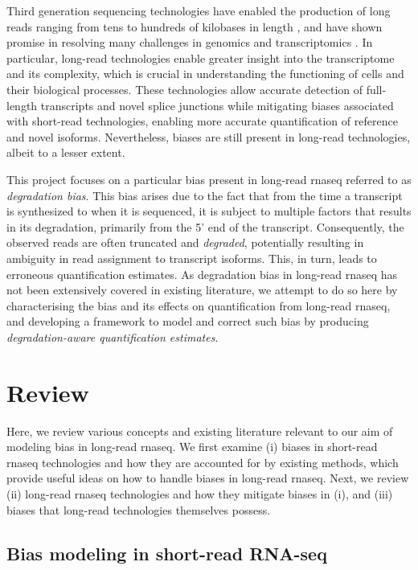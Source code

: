 
Third generation sequencing technologies have enabled the production of long reads ranging from tens to hundreds of kilobases in length \cite{Pollard2018}, and have shown promise in resolving many challenges in genomics and transcriptomics \cite{Bolisetty2015, Byrne2017, DeCoster2019, Liu2019, Mantere2019, Nurk2021}. In particular, long-read technologies enable greater insight into the transcriptome and its complexity, which is crucial in understanding the functioning of cells and their biological processes. These technologies allow accurate detection of full-length transcripts and novel splice junctions while mitigating biases associated with short-read technologies, enabling more accurate quantification of reference and novel isoforms. Nevertheless, biases are still present in long-read technologies, albeit to a lesser extent. 

This project focuses on a particular bias present in long-read \gls{rnaseq} referred to as \textit{degradation bias}. This bias arises due to the fact that from the time a transcript is synthesized to when it is sequenced, it is subject to multiple factors that results in its degradation, primarily from the 5' end of the transcript. Consequently, the observed reads are often truncated and \textit{degraded}, potentially resulting in ambiguity in read assignment to transcript isoforms. This, in turn, leads to erroneous quantification estimates. As degradation bias in long-read \gls{rnaseq} has not been extensively covered in existing literature, we attempt to do so here by characterising the bias and its effects on quantification from long-read \gls{rnaseq}, and developing a framework to model and correct such bias by producing \textit{degradation-aware quantification estimates}.

\section{Review}

Here, we review various concepts and existing literature relevant to our aim of modeling bias in long-read \gls{rnaseq}. We first examine (i) biases in short-read \gls{rnaseq} technologies and how they are accounted for by existing methods, which provide useful ideas on how to handle biases in long-read \gls{rnaseq}. Next, we review (ii) long-read \gls{rnaseq} technologies and how they mitigate biases in (i), and (iii) biases that long-read technologies themselves possess. 

\subsection{Bias modeling in short-read RNA-seq}

